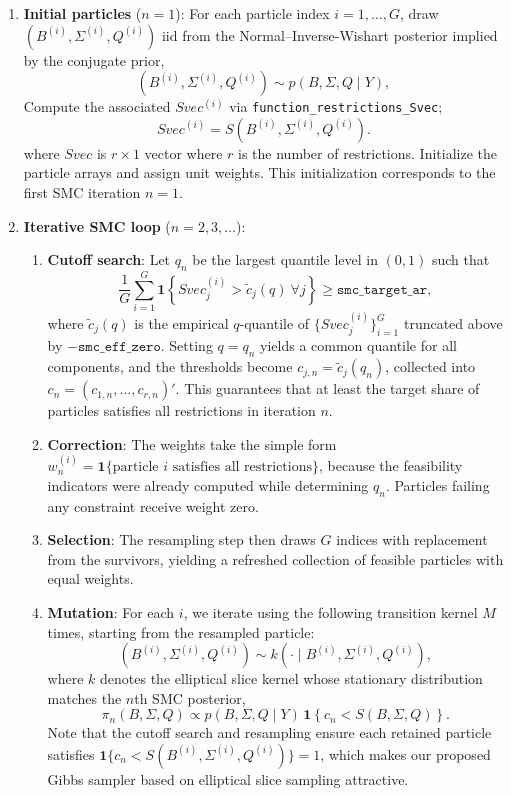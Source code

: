 \documentclass[11pt]{article}
\begin{document}
\begin{enumerate}[leftmargin=*]
    \item \textbf{Initial particles} ($n=1$): For each particle index $i = 1,\ldots,G$, draw $(B^{(i)},\Sigma^{(i)},Q^{(i)})$ iid from the Normal--Inverse-Wishart posterior implied by the conjugate prior,
    \[
    (B^{(i)},\Sigma^{(i)},Q^{(i)}) \sim p(B,\Sigma, Q \mid Y),
    \]    
    Compute the associated $Svec^{(i)}$ via \texttt{function\_restrictions\_Svec}; 
    \[
    Svec^{(i)} = S\!\left(B^{(i)},\Sigma^{(i)},Q^{(i)}\right).
    \]
    where $Svec$ is $r \times 1$ vector where $r$ is the number of restrictions.
    Initialize the particle arrays and assign unit weights. This initialization corresponds to the first SMC iteration $n=1$.
    \item \textbf{Iterative SMC loop} ($n=2, 3, \ldots$):
    \begin{enumerate}[label*=\arabic*., leftmargin=*]
        \item \textbf{Cutoff search}: Let $q_n$ be the largest quantile level in $(0,1)$ such that
        \[
            \frac{1}{G}\sum_{i=1}^G \mathbf{1}\!\left\{Svec^{(i)}_j > \widetilde{c}_j(q) \ \forall j\right\} \ge \texttt{smc\_target\_ar},
        \]
        where $\widetilde{c}_j(q)$ is the empirical $q$-quantile of $\{Svec^{(i)}_j\}_{i=1}^G$ truncated above by $-\texttt{smc\_eff\_zero}$. Setting $q = q_n$ yields a common quantile for all components, and the thresholds become $c_{j,n} = \widetilde{c}_j(q_n)$, collected into $c_n = (c_{1,n},\ldots,c_{r,n})'$. This guarantees that at least the target share of particles satisfies all restrictions in iteration $n$.
        \item \textbf{Correction}: The weights take the simple form $w^{(i)}_n = \mathbf{1}\!\{\text{particle } i \text{ satisfies all restrictions}\}$, because the feasibility indicators were already computed while determining $q_n$. Particles failing any constraint receive weight zero. 
        
        \item \textbf{Selection}:
        The resampling step then draws $G$ indices with replacement from the survivors, yielding a refreshed collection of feasible particles with equal weights.
        \item \textbf{Mutation}: For each $i$, we iterate using the following transition kernel $M$ times, starting from the resampled particle:
            \[
                (B^{(i)}, \Sigma^{(i)}, Q^{(i)}) \sim k(\cdot \mid B^{(i)}, \Sigma^{(i)}, Q^{(i)}),
            \]
        where $k$ denotes the elliptical slice kernel whose stationary distribution matches the $n$th SMC posterior,
        \[
            \pi_n(B,\Sigma,Q) \propto p(B,\Sigma,Q \mid Y)\,\mathbf{1}\!\left\{c_n < S(B,\Sigma,Q)\right\}.
        \]
        Note that the cutoff search and resampling ensure each retained particle satisfies $\mathbf{1}\{c_n < S(B^{(i)},\Sigma^{(i)},Q^{(i)})\}=1$, which makes our proposed Gibbs sampler based on elliptical slice sampling attractive. 


\end{enumerate}
\end{enumerate}
\end{document}
